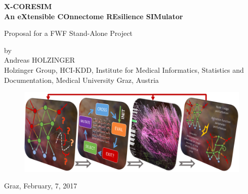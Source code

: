 \documentclass[a4paper,11pt]{article}
\begin{document}
\begin{titlepage}
\begin{center}
\bfseries\Large
X-CORESIM\\ 
An eXtensible COnnectome REsilience SIMulator
\\[0,6cm]
\normalfont\normalsize

Proposal for a FWF Stand-Alone Project

by\\
Andreas HOLZINGER\\

Holzinger Group, HCI-KDD, Institute for Medical Informatics, Statistics and Documentation,
Medical University Graz, Austria
\\[0,4cm]
\begin{figure}[ht]
	\includegraphics[width=\textwidth]{images/Pipeline}
\end{figure}
%
Graz, February, 7, 2017

\end{center}
\vspace{0.5\baselineskip}
\end{titlepage}
\end{document}
